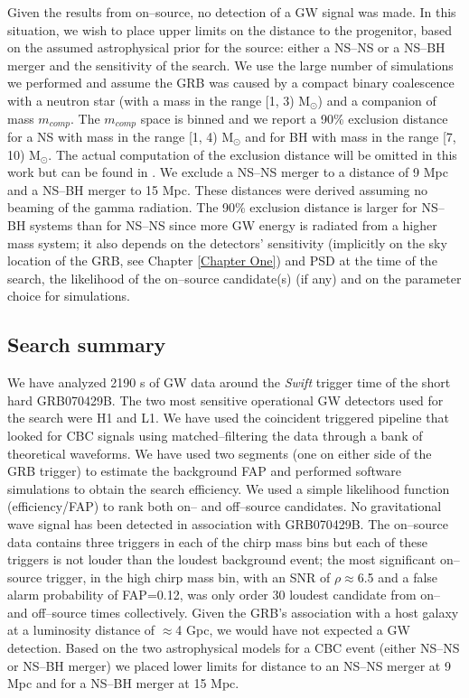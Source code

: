 Given the results from on--source, no detection of a GW signal was made. In this situation, we wish to place upper limits on the distance to the progenitor, based on the assumed astrophysical prior for the source: either a NS--NS or a NS--BH merger and the sensitivity of the search. We use the large number of simulations we performed and assume the GRB was caused by a compact binary coalescence with a neutron star (with a mass in the range [1, 3) $\mathrm{M}_{\odot}$) and a companion of mass $m_{comp}$. The $m_{comp}$ space is binned and we report a 90\% exclusion distance for a NS with mass in the range [1, 4) $\mathrm{M}_{\odot}$ and for BH with mass in the range [7, 10) $\mathrm{M}_{\odot}$. The actual computation of the exclusion distance will be omitted in this work but can be found in \cite{Abadie:2010uf}. We exclude a NS--NS merger to a distance of 9 Mpc and a NS--BH merger to 15 Mpc. These distances were derived assuming no beaming of the gamma radiation. The 90\% exclusion distance is larger for NS--BH systems than for NS--NS since more GW energy is radiated from a higher mass system; it also depends on the detectors' sensitivity (implicitly on the sky location of the GRB, see Chapter \ref{Chapter One}) and PSD at the time of the search, the likelihood of the on--source candidate(s) (if any) and on the parameter choice for simulations.


\subsection{Search summary}
We have analyzed 2190 s of GW data around the \emph{Swift} trigger time of the short hard GRB070429B. The two most sensitive operational GW detectors used for the search were H1 and L1. We have used the coincident triggered pipeline that looked for CBC signals using matched--filtering the data through a bank of theoretical waveforms. We have used two segments (one on either side of the GRB trigger) to estimate the background FAP and performed software simulations to obtain the search efficiency. We used a simple likelihood function (efficiency/FAP) to rank both on-- and off--source candidates. No gravitational wave signal has been detected in association with GRB070429B. The on--source data contains three triggers in each of the chirp mass bins but each of these triggers is not louder than the loudest background event; the most significant on--source trigger, in the high chirp mass bin, with an SNR of $\rho\approx$6.5 and a false alarm probability of FAP=0.12, was only order 30 loudest candidate from on-- and off--source times collectively. Given the GRB's association with a host galaxy at a luminosity distance of $\approx$4 Gpc, we would have not expected a GW detection. Based on the two astrophysical models for a CBC event (either NS--NS or NS--BH merger) we placed lower limits for distance to an NS--NS merger at 9 Mpc and for a NS--BH merger at 15 Mpc.

